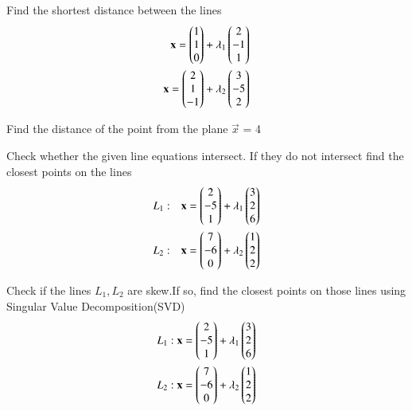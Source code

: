 
  
\item Find the shortest distance between the lines
\begin{align}
\mathbf{x}=\begin{pmatrix}1\\1\\0\end{pmatrix}+\lambda_1\begin{pmatrix}2\\-1\\1\end{pmatrix}\\
\mathbf{x}=\begin{pmatrix}2\\1\\-1\end{pmatrix}+\lambda_2\begin{pmatrix}3\\-5\\2\end{pmatrix}
\end{align}
\solution

\item Find the distance of the point  from the plane $\vec{x}$ = 4
\\
\solution

%
\item  Check whether the given line equations intersect. If they do not  intersect find the closest points on the lines 
\begin{align}
L_1 & : & \mathbf{x}=\begin{pmatrix}2\\-5\\1\end{pmatrix}+\lambda_1\begin{pmatrix}3\\2\\6\end{pmatrix}\\
L_2 & : & \mathbf{x}=\begin{pmatrix}7\\-6\\0\end{pmatrix}+\lambda_2\begin{pmatrix}1\\2\\2\end{pmatrix}\end{align}
\solution

\item Check if the lines $L_1,L_2$ are skew.If so, find the closest points on those lines using Singular Value Decomposition(SVD)
\begin{align}
L_1: \mathbf{x}=\begin{pmatrix}2\\-5\\1\end{pmatrix}+\lambda_1\begin{pmatrix}3\\2\\6\end{pmatrix}\\
L_2: \mathbf{x}=\begin{pmatrix}7\\-6\\0\end{pmatrix}+\lambda_2\begin{pmatrix}1\\2\\2\end{pmatrix}
\end{align}

